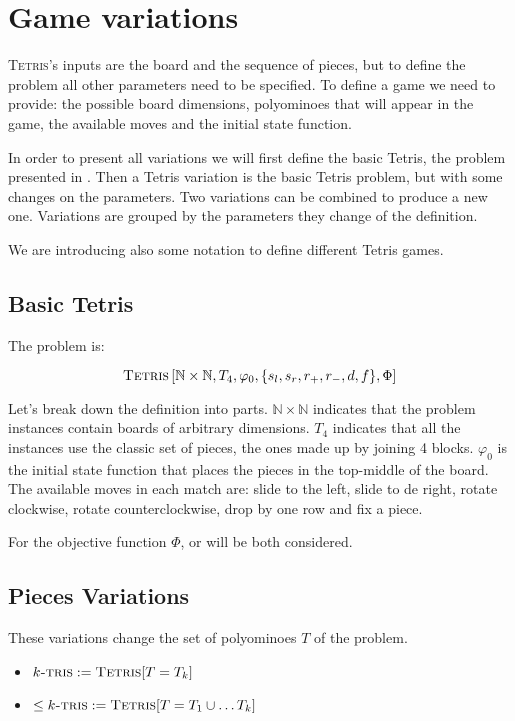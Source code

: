 \section{Game variations}

\textsc{Tetris}'s inputs are the board and the sequence of pieces, but to define the problem all other parameters need to be specified. To define a game we need to provide: the possible board dimensions, polyominoes that will appear in the game, the available moves and the initial state function.

In order to present all variations we will first define the basic Tetris, the problem presented in \cite{TIH}. Then a Tetris variation is the basic Tetris problem, but with some changes on the parameters. Two variations can be combined to produce a new one. Variations are grouped by the parameters they change of the definition.

We are introducing also some notation to define different Tetris games. 

\subsection{Basic Tetris}

The problem is:

$$\textsc{Tetris}\left[ \mathbb{N} \times \mathbb{N},T_4,\varphi_0, \{s_l,s_r, r_+, r_-, d, f \},\Phi \right]$$

Let's break down the definition into parts. $\mathbb{N} \times \mathbb{N}$ indicates that the problem instances contain boards of arbitrary dimensions. $T_4$ indicates that all the instances use the classic set of pieces, the ones made up by joining 4 blocks. $\varphi_0$ is the initial state function that places the pieces in the top-middle of the board. The available moves in each match are: slide to the left, slide to de right, rotate clockwise, rotate counterclockwise, drop by one row and fix a piece. 

For the objective function $\Phi$, \clearing or \survival will be both considered.


\subsection{Pieces Variations}

These variations change the set of polyominoes $T$ of the problem. 

\begin{itemize}

  \item $k\textsc{-tris} := \textsc{Tetris}[T = T_k]$ 

  \item $\leq k\textsc{-tris} := \textsc{Tetris}[T = T_1 \cup \dots T_k]$

\end{itemize}

